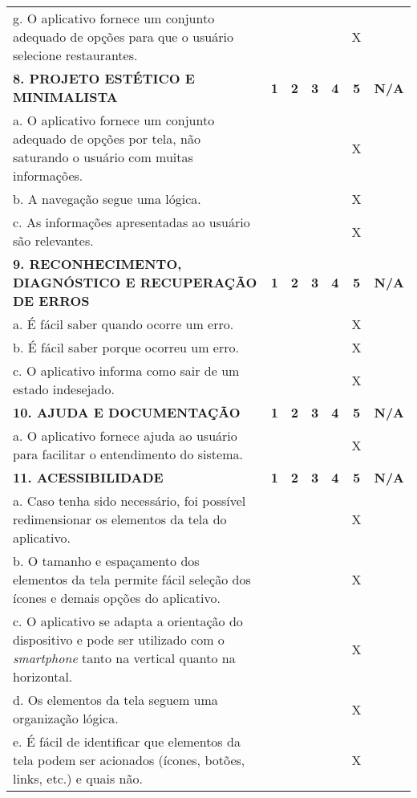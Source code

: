 \documentclass[portuguese,oneside]{tcc}
\begin{document}
\begin{table}[h]
{\begin{tabu}{|L{25em}|c|c|c|c|c|c|}
				g. O aplicativo fornece um conjunto adequado de opções para que o usuário selecione restaurantes. & & & & & X & \\ 
				\textbf{8. PROJETO ESTÉTICO E MINIMALISTA} & \textbf{1} & \textbf{2} & \textbf{3} & \textbf{4} & \textbf{5} & \textbf{N/A} \\ 
				a. O aplicativo fornece um conjunto adequado de opções por tela, não saturando o usuário com muitas informações. & & & & & X & \\ 
				b. A navegação segue uma lógica. & & & & & X & \\ 
				c. As informações apresentadas ao usuário são relevantes. & & & & & X & \\ 
				\textbf{9. RECONHECIMENTO, DIAGNÓSTICO E RECUPERAÇÃO DE ERROS} & \textbf{1} & \textbf{2} & \textbf{3} & \textbf{4} & \textbf{5} & \textbf{N/A} \\ 
				a. É fácil saber quando ocorre um erro.	& & & & & X & \\ 
				b. É fácil saber porque ocorreu um erro. & & & & & X & \\ 
				c. O aplicativo informa como sair de um estado indesejado. & & & & & X & \\ 
				\textbf{10. AJUDA E DOCUMENTAÇÃO} & \textbf{1} & \textbf{2} & \textbf{3} & \textbf{4} & \textbf{5} & \textbf{N/A} \\ 
				a. O aplicativo fornece ajuda ao usuário para facilitar o entendimento do sistema. & & & & & X & \\ 
				\textbf{11. ACESSIBILIDADE} & \textbf{1} & \textbf{2} & \textbf{3} & \textbf{4} & \textbf{5} & \textbf{N/A} \\ 
				a. Caso tenha sido necessário, foi possível redimensionar os elementos da tela do aplicativo. & & & & & X & \\ 
				b. O tamanho e espaçamento dos elementos da tela permite fácil seleção dos ícones e demais opções do aplicativo. & & & & & X & \\ 
				c. O aplicativo se adapta a orientação do dispositivo e pode ser utilizado com o \emph{smartphone} tanto na vertical quanto na horizontal. & & & & & X & \\ 
				d. Os elementos da tela seguem uma organização lógica. & & & & & X & \\ 
				e. É fácil de identificar que elementos da tela podem ser acionados (ícones, botões, links, etc.) e quais não. & & & & & X & \\ 

\end{tabu}}
\end{table}
\end{document}
